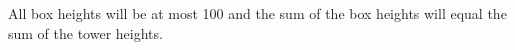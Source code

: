 All box heights will be at most 100 and the sum of the box heights will equal the sum of the tower heights.

